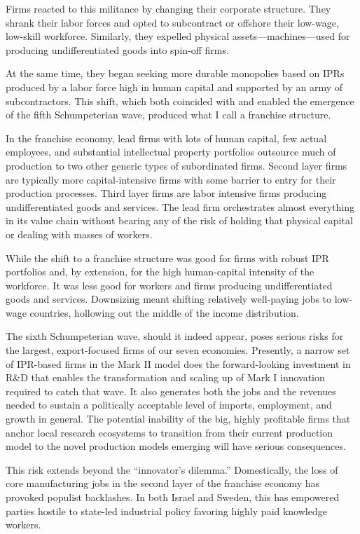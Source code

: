 \documentclass[
]{book}
\begin{document}
Firms reacted to this militance by changing their corporate structure. They shrank their labor forces and opted to subcontract or offshore their low-wage, low-skill workforce. Similarly, they expelled physical assets---machines---used for producing undifferentiated goods into spin-off firms.

At the same time, they began seeking more durable monopolies based on IPRs produced by a labor force high in human capital and supported by an army of subcontractors. This shift, which both coincided with and enabled the emergence of the fifth Schumpeterian wave, produced what I call a franchise structure.

In the franchise economy, lead firms with lots of human capital, few actual employees, and substantial intellectual property portfolios outsource much of production to two other generic types of subordinated firms. Second layer firms are typically more capital-intensive firms with some barrier to entry for their production processes. Third layer firms are labor intensive firms producing undifferentiated goods and services. The lead firm orchestrates almost everything in its value chain without bearing any of the risk of holding that physical capital or dealing with masses of workers.

While the shift to a franchise structure was good for firms with robust IPR portfolios and, by extension, for the high human-capital intensity of the workforce. It was less good for workers and firms producing undifferentiated goods and services. Downsizing meant shifting relatively well-paying jobs to low-wage countries, hollowing out the middle of the income distribution.

The sixth Schumpeterian wave, should it indeed appear, poses serious risks for the largest, export-focused firms of our seven economies. Presently, a narrow set of IPR-based firms in the Mark II model does the forward-looking investment in R\&D that enables the transformation and scaling up of Mark I innovation required to catch that wave. It also generates both the jobs and the revenues needed to sustain a politically acceptable level of imports, employment, and growth in general. The potential inability of the big, highly profitable firms that anchor local research ecosystems to transition from their current production model to the novel production models emerging will have serious consequences.

This risk extends beyond the ``innovator's dilemma.'' Domestically, the loss of core manufacturing jobs in the second layer of the franchise economy has provoked populist backlashes. In both Israel and Sweden, this has empowered parties hostile to state-led industrial policy favoring highly paid knowledge workers.
\end{document}
